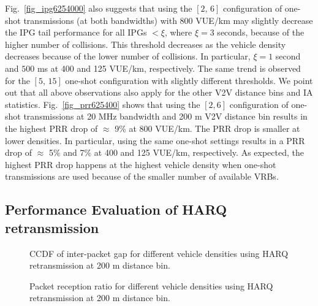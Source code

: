 \documentclass[conference]{IEEEtran}
\begin{document}
Fig.~\ref{fig_ipg6254000} also suggests that using the $[2,\,6]$ configuration of one-shot transmissions (at both bandwidths) with 800 VUE/km may slightly decrease the IPG tail performance for all IPGs $<\xi$, where $\xi=3$ seconds, because of the higher number of collisions. This threshold decreases as the vehicle density decreases because of the lower number of collisions. In particular, $\xi=1$ second and $500$ ms at 400 and 125 VUE/km, respectively. The same trend is observed for the $[5,\,15]$ one-shot configuration with slightly different thresholds. We point out that all above observations also apply for the other V2V distance bins and IA statistics. Fig.~\ref{fig_prr625400} shows that using the $[2,6]$ configuration of one-shot transmissions at 20 MHz bandwidth and 200 m V2V distance bin results in the highest PRR drop of $\approx$ 9\% at 800 VUE/km. The PRR drop is smaller at lower densities. In particular, using the same one-shot settings results in a PRR drop of $\approx$ 5\% and 7\% at 400 and 125 VUE/km, respectively. As expected, the highest PRR drop happens at the highest vehicle density when one-shot transmissions are used because of the smaller number of available VRBs.

\subsection{Performance Evaluation of HARQ retransmission}
\begin{figure*}
\caption{CCDF of inter-packet gap for different vehicle densities using HARQ retransmission at 200 m distance bin.}
\vspace{-.15in}
\label{fig_ipgccdfh2}
\end{figure*}

\begin{figure*}
\caption{Packet reception ratio for different vehicle densities using HARQ retransmission at 200 m distance bin.}
\vspace{-.2in}
\label{fig_prrh2}
\end{figure*}
\end{document}
